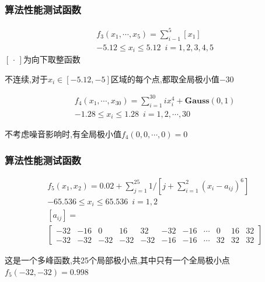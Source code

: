 \documentclass{beamer}
\begin{document}
	\begin{frame}
		\frametitle{算法性能测试函数}
	\begin{definition}
		\begin{eqnarray*}
			&f_3(x_1,\cdots,x_5)=\sum_{i-1}^{5}[x_1]\\
			&-5.12\le x_i \le 5.12 \,\,\,i=1,2,3,4,5		
		\end{eqnarray*}
		$[\,\cdot \,]$为向下取整函数
	\end{definition}
不连续,对于$x_i\in [-5.12,-5]$区域的每个点,都取全局极小值$-30$
		\begin{definition}
			\begin{eqnarray*}
				&f_4(x_1,\cdots,x_{30})=\sum_{i=1}^{30} ix_i^4 +\textbf{Gauss}(0,1)\\
				&-1.28\le x_i \le 1.28 \,\,\,i=1,2,\cdots,30
			\end{eqnarray*}
		\end{definition}
	不考虑噪音影响时,有全局极小值$f_4(0,0,\cdots,0)=0$
	\end{frame}
	\begin{frame}
		\frametitle{算法性能测试函数}
	\begin{definition}
		\begin{eqnarray*}
			&f_5(x_1,x_2)=0.02+\sum_{j=1}^{25} 1/[j+\sum_{i=1}^{2} (x_i-a_{ij})^6]\\
			&-65.536\le x_i \le 65.536 \,\,\,i=1,2 \\
			&[a_{ij}]=\\
			&\left[
				\begin{array}{ccccccccccc}
					-32 & -16 & 0 & 16 & 32 & -32 & -16 & \cdots &0 & 16 & 32\\
					-32 & -32  & -32 & -32 & -32 & -16& -16 & \cdots & 32& 32& 32
				\end{array}
			\right]
		\end{eqnarray*}
	\end{definition}
	这是一个多峰函数,共25个局部极小点,其中只有一个全局极小点$f_5(-32,-32)=0.998$
		
	
	\end{frame}
\end{document}
